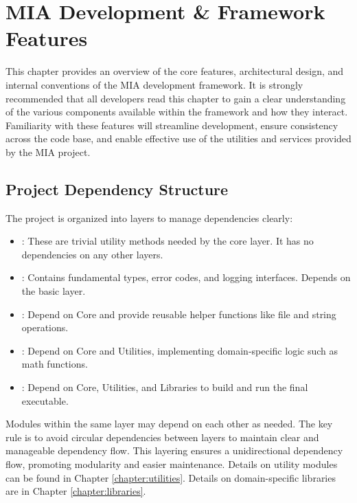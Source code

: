 \chapter{MIA Development \& Framework Features}
\pagestyle{fancy}

This chapter provides an overview of the core features, architectural design, and internal conventions of the MIA development framework. It is strongly recommended that all developers read this chapter to gain a clear understanding of the various components available within the framework and how they interact. Familiarity with these features will streamline development, ensure consistency across the code base, and enable effective use of the utilities and services provided by the MIA project.




\section{Project Dependency Structure}\label{section:dependancy_structure}

The project is organized into layers to manage dependencies clearly:
\begin{itemize}\itemsep0em
	\item {}: These are trivial utility methods needed by the core layer. It has no dependencies on any other layers.
	\item {}: Contains fundamental types, error codes, and logging interfaces. Depends on the basic layer.
	\item {}: Depend on Core and provide reusable helper functions like file and string operations.
	\item {}: Depend on Core and Utilities, implementing domain-specific logic such as math functions.
	\item {}: Depend on Core, Utilities, and Libraries to build and run the final executable.
\end{itemize}
Modules within the same layer may depend on each other as needed. The key rule is to avoid circular dependencies between layers to maintain clear and manageable dependency flow. This layering ensures a unidirectional dependency flow, promoting modularity and easier maintenance. Details on utility modules can be found in Chapter \ref{chapter:utilities}. Details on domain-specific libraries are in Chapter \ref{chapter:libraries}.







